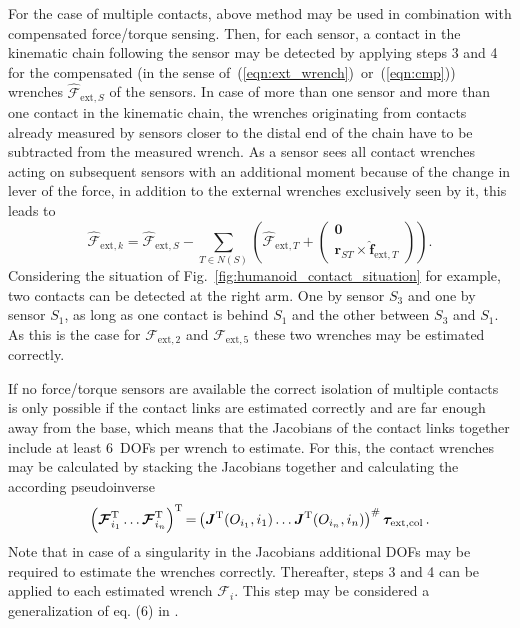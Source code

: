 For the case of multiple contacts, above method may be used in combination with compensated force/torque sensing. Then, for each sensor, a contact in the kinematic chain following the sensor may be detected by applying steps 3 and 4 for the compensated (in the sense of~(\ref{eqn:ext_wrench})~or~(\ref{eqn:cmp})) wrenches $\hat{\bm{\mathcal{F}}}_{\mathrm{ext},S}$ of the sensors.
In case of more than one sensor and more than one contact in the kinematic chain, the wrenches originating from contacts already measured by sensors closer to the distal end of the chain have to be subtracted from the measured wrench.
As a sensor sees all contact wrenches acting on subsequent sensors with an additional moment because of the change in lever of the force, in addition to the external wrenches exclusively seen by it, this leads to
%
\begin{equation}
\hat{\bm{\mathcal{F}}}_{\mathrm{ext},k}=\hat{\bm{\mathcal{F}}}_{\mathrm{ext},S}-\sum_{T\in N(S)}\left(\hat{\bm{\mathcal{F}}}_{\mathrm{ext},T}+\begin{pmatrix}
\bm{0}\\\bm{r}_{ST}\times\hat{\bm{f}}_{\mathrm{ext},T}
\end{pmatrix}\right).\label{eqn:cmp_ext_vorher}
\end{equation}
%
Considering the situation of Fig.~\ref{fig:humanoid_contact_situation} for example, two contacts can be detected at the right arm.
One by sensor $S_3$ and one by sensor $S_1$, as long as one contact is behind $S_1$ and the other between $S_3$ and $S_1$.
As this is the case for $\bm{\mathcal{F}}_{\mathrm{ext},2}$ and $\bm{\mathcal{F}}_{\mathrm{ext},5}$ these two wrenches may be estimated correctly.

If no force/torque sensors are available the correct isolation of multiple contacts is only possible if the contact links are estimated correctly and are far enough away from the base, which means that the Jacobians of the contact links together include at least 6~DOFs per wrench to estimate. For this, the contact wrenches may be calculated by stacking the Jacobians together and calculating the according pseudoinverse
%
\begin{equation}
\medmuskip=3mu
\thinmuskip=3mu
\thickmuskip=3mu
\left(
\bm{\mathcal{F}}_{i_1}^\mathrm{T} \ldots \bm{\mathcal{F}}_{i_n}^\mathrm{T}\right)^\mathrm{T}=\left(
\bm{J}^\mathrm{T}(O_{i_1},i_1) \ldots  \bm{J}^\mathrm{T}(O_{i_n},i_n)\right)^\#\bm{\tau}_\mathrm{ext,col}\;.\label{eqn:multi_iso}
\end{equation}
%
Note that in case of a singularity in the Jacobians additional DOFs may be required to estimate the wrenches correctly.
Thereafter, steps 3 and 4 can be applied to each estimated wrench $\bm{\mathcal{F}}_{i}$. This step may be considered  a generalization of eq. (6) in \cite{OttHenLee2013}.

